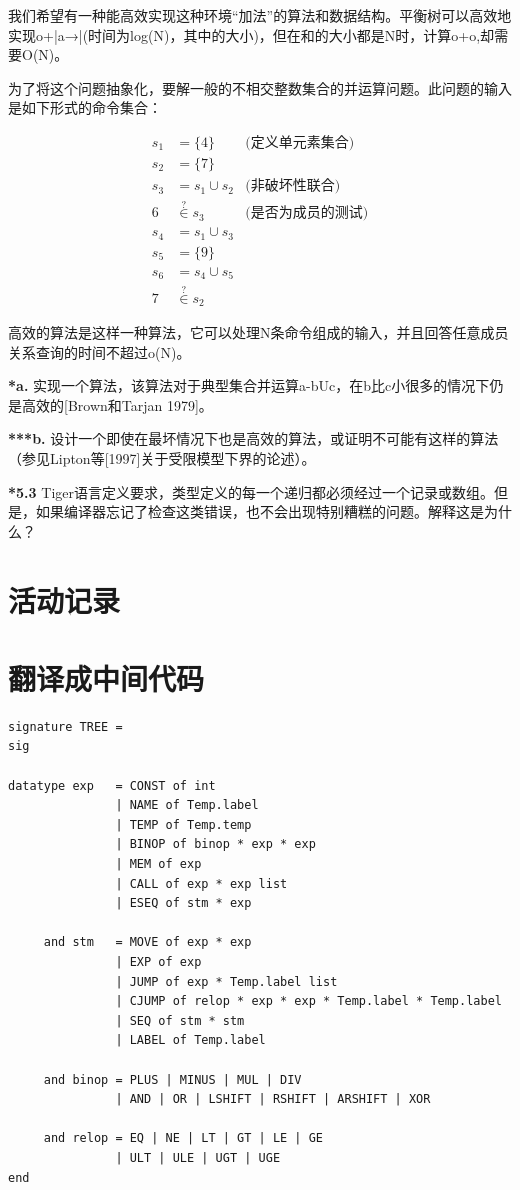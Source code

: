 \documentclass[cn,11pt,chinese]{elegantbook}
\begin{document}
我们希望有一种能高效实现这种环境“加法”的算法和数据结构。平衡树可以高效地实现o+|a→|(时间为log(N)，其中的大小)，但在和的大小都是N时，计算o+o,却需要O(N)。

为了将这个问题抽象化，要解一般的不相交整数集合的并运算问题。此问题的输入是如下形式的命令集合：

\begin{align*}
  s_1 &= \{4\}              &\text{(定义单元素集合)}   \\
  s_2 &= \{7\}                                 \\
  s_3 &= s_1\cup s_2        &\text{(非破坏性联合)}     \\
  6   &\overset{?}{\in} s_3 &\text{(是否为成员的测试)} \\
  s_4 &= s_1\cup s_3                           \\
  s_5 &= \{9\}                                 \\
  s_6 &= s_4\cup s_5                           \\
  7   &\overset{?}{\in} s_2
\end{align*}

高效的算法是这样一种算法，它可以处理N条命令组成的输入，并且回答任意成员关系查询的时间不超过o(N)。

\textbf{*a.} 实现一个算法，该算法对于典型集合并运算a-bUc，在b比c小很多的情况下仍是高效的[Brown和Tarjan 1979]。

\textbf{***b.} 设计一个即使在最坏情况下也是高效的算法，或证明不可能有这样的算法（参见Lipton等[1997]关于受限模型下界的论述）。

\textbf{*5.3} Tiger语言定义要求，类型定义的每一个递归都必须经过一个记录或数组。但是，如果编译器忘记了检查这类错误，也不会出现特别糟糕的问题。解释这是为什么？

\chapter{活动记录}

\chapter{翻译成中间代码}

\begin{verbatim}
signature TREE =
sig

datatype exp   = CONST of int
               | NAME of Temp.label
               | TEMP of Temp.temp
               | BINOP of binop * exp * exp
               | MEM of exp
               | CALL of exp * exp list
               | ESEQ of stm * exp

     and stm   = MOVE of exp * exp
               | EXP of exp
               | JUMP of exp * Temp.label list
               | CJUMP of relop * exp * exp * Temp.label * Temp.label
               | SEQ of stm * stm
               | LABEL of Temp.label

     and binop = PLUS | MINUS | MUL | DIV
               | AND | OR | LSHIFT | RSHIFT | ARSHIFT | XOR

     and relop = EQ | NE | LT | GT | LE | GE
               | ULT | ULE | UGT | UGE
end
\end{verbatim}
\end{document}
